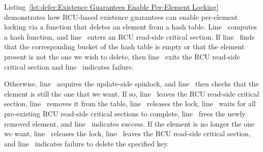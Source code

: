 \begin{fcvref}
Listing~\ref{lst:defer:Existence Guarantees Enable Per-Element Locking}
demonstrates how RCU-based existence guarantees can enable
per-element locking via a function that deletes an element from
a hash table.
Line~ computes a hash function, and line~ enters an RCU
read-side critical section.
If line~ finds that the corresponding bucket of the hash table is
empty or that the element present is not the one we wish to delete,
then line~ exits the RCU read-side critical section and
line~
indicates failure.
\end{fcvref}

\QuickQuizEnd

\begin{fcvref}
Otherwise, line~ acquires the update-side spinlock, and
line~ then checks that the element is still the one that we want.
If so, line~ leaves the RCU read-side critical section,
line~ removes it from the table, line~ releases
the lock, line~ waits for all pre-existing RCU read-side critical
sections to complete, line~ frees the newly removed element,
and line~ indicates success.
If the element is no longer the one we want, line~ releases
the lock, line~ leaves the RCU read-side critical section,
and line~ indicates failure to delete the specified key.
\end{fcvref}

